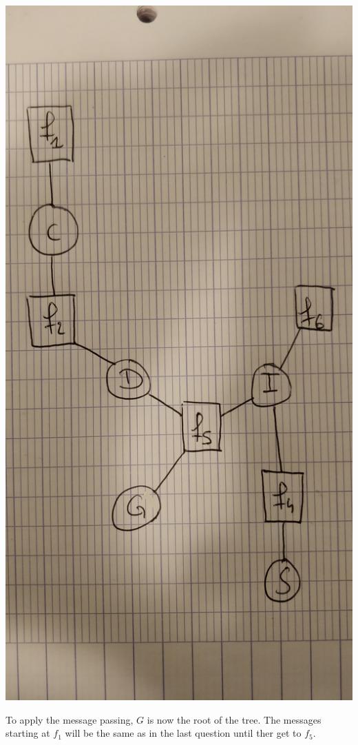 \documentclass[a4paper, 10pt]{article}
\begin{document}
\begin{center}
\includegraphics[angle=90, scale=0.06]{graph2}
\end{center}
To apply the message passing, $G$ is now the root of the tree. The messages starting at $f_1$
will be the same as in the last question until ther get to $f_5$.
\end{document}
